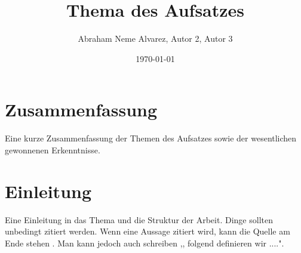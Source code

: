 \documentclass[a4paper,listof=totoc,bibliography=totoc]{scrartcl}
\title{Thema des Aufsatzes}
\author{Abraham Neme Alvarez, Autor 2, Autor 3}
\date{\today}
\begin{document}
\maketitle

\section{Zusammenfassung}

Eine kurze Zusammenfassung der Themen des Aufsatzes sowie der wesentlichen
gewonnenen Erkenntnisse.

\section{Einleitung}

Eine Einleitung in das Thema und die Struktur der Arbeit. Dinge sollten
unbedingt zitiert werden. Wenn eine Aussage zitiert wird, kann die Quelle
am Ende stehen \cite{popper:2005}. Man kann jedoch auch schreiben
,,\citet{feyerabend:1986} folgend definieren wir ....".

{}

\end{document}

